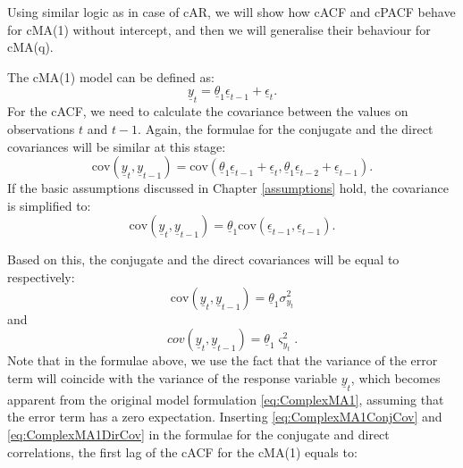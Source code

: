 \documentclass[
]{book}
\begin{document}
Using similar logic as in case of cAR, we will show how cACF and cPACF behave for cMA(1) without intercept, and then we will generalise their behaviour for cMA(q).

The cMA(1) model can be defined as:
\begin{equation}
    \underline{y}_t = \underline{\theta}_1 \underline{\epsilon}_{t-1} + \underline{\epsilon}_t .
    \label{eq:ComplexMA1}
\end{equation}
For the cACF, we need to calculate the covariance between the values on observations \(t\) and \(t-1\). Again, the formulae for the conjugate and the direct covariances will be similar at this stage:
\begin{equation}
    \mathrm{cov} \left(\underline{y}_t, \underline{y}_{t-1} \right) = \mathrm{cov}\left( \underline{\theta}_1 \underline{\epsilon}_{t-1} + \underline{\epsilon}_t, \underline{\theta}_1 \underline{\epsilon}_{t-2} + \underline{\epsilon}_{t-1} \right).
    \label{eq:ComplexMA1Step1}
\end{equation}
If the basic assumptions discussed in Chapter \ref{assumptions} hold, the covariance is simplified to:
\begin{equation}
    \mathrm{cov} \left(\underline{y}_t, \underline{y}_{t-1} \right) = \underline{\theta}_1 \mathrm{cov}\left( \underline{\epsilon}_{t-1}, \underline{\epsilon}_{t-1} \right).
    \label{eq:ComplexMA1Step2}
\end{equation}

Based on this, the conjugate and the direct covariances will be equal to respectively:
\begin{equation}
    \mathrm{cov} \left(\underline{y}_t, \underline{y}_{t-1} \right) = \underline{\theta}_1 \sigma^2_{y_t}
    \label{eq:ComplexMA1ConjCov}
\end{equation}
and
\begin{equation}
    {cov} \left(\underline{y}_t, \underline{y}_{t-1} \right) = \underline{\theta}_1 \varsigma^2_{y_t}.
    \label{eq:ComplexMA1DirCov}
\end{equation}
Note that in the formulae above, we use the fact that the variance of the error term will coincide with the variance of the response variable \(\underline{y}_t\), which becomes apparent from the original model formulation \eqref{eq:ComplexMA1}, assuming that the error term has a zero expectation. Inserting \eqref{eq:ComplexMA1ConjCov} and \eqref{eq:ComplexMA1DirCov} in the formulae for the conjugate and direct correlations, the first lag of the cACF for the cMA(1) equals to:
\end{document}
